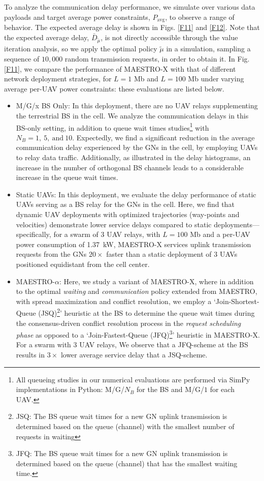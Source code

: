 \documentclass[12pt, draftcls, onecolumn]{IEEEtran}
\theoremstyle{plain}
\theoremstyle{definition}
\theoremstyle{remark}
\begin{document}
To analyze the communication delay performance, we simulate over various data payloads and target average power constraints, $P_{\mathrm{avg}}$, to observe a range of behavior. The expected average delay is shown in Figs. \ref{F11} and \ref{F12}. Note that the expected average delay, $\bar{D}_{\tilde\mu}$, is not directly accessible through the value iteration analysis, so we apply the optimal policy $\tilde{\mu}$ in a simulation, sampling a sequence of $10,000$ random transmission requests, in order to obtain it. In Fig. \ref{F11}, we compare the performance of MAESTRO-X with that of different network deployment strategies, for $L=1$ Mb and $L=100$ Mb under varying average per-UAV power constraints: these evaluations are listed below.
\begin{itemize}
    \item M/G/x BS Only: In this deployment, there are no UAV relays supplementing the terrestrial BS in the cell. We analyze the communication delays in this BS-only setting, in addition to queue wait times studies\footnote{All queueing studies in our numerical evaluations are performed via SimPy implementations in Python: M/G/$N_{B}$ for the BS and M/G/$1$ for each UAV.} with $N_{B}=1,\ 5,\ \text{and}\ 10$. Expectedly, we find a significant reduction in the average communication delay experienced by the GNs in the cell, by employing UAVs to relay data traffic. Additionally, as illustrated in the delay histograms, an increase in the number of orthogonal BS channels leads to a considerable increase in the queue wait times.
    \item Static UAVs: In this deployment, we evaluate the delay performance of static UAVs serving as a BS relay for the GNs in the cell. Here, we find that dynamic UAV deployments with optimized trajectories (way-points and velocities) demonstrate lower service delays compared to static deployments---specifically, for a swarm of $3$ UAV relays, with $L=100$ Mb and a per-UAV power consumption of \qty[mode=text]{1.37}{\kilo\watt}, MAESTRO-X services uplink transmission requests from the GNs $20{\times}$ faster than a static deployment of $3$ UAVs positioned equidistant from the cell center.
    \item MAESTRO-$\alpha$: Here, we study a variant of MAESTRO-X, where in addition to the optimal \emph{waiting} and \emph{communication} policy extended from MAESTRO, with spread maximization and conflict resolution, we employ a `Join-Shortest-Queue (JSQ)\footnote{JSQ: The BS queue wait times for a new GN uplink transmission is determined based on the queue (channel) with the smallest number of requests in waiting}' heuristic at the BS to determine the queue wait times during the consensus-driven conflict resolution process in the \emph{request scheduling phase} as opposed to a `Join-Fastest-Queue (JFQ)\footnote{JFQ: The BS queue wait times for a new GN uplink transmission is determined based on the queue (channel) that has the smallest waiting time.}' heuristic in MAESTRO-X. For a swarm with $3$ UAV relays, We observe that a JFQ-scheme at the BS results in $3{\times}$ lower average service delay that a JSQ-scheme.

\end{itemize}
\end{document}
